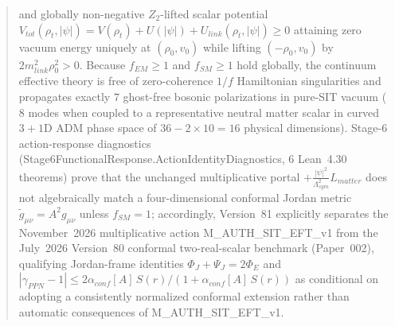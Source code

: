 \documentclass[american,11pt,letterpaper]{article}
\def\mathbb#1{#1}%
\def\mathcal#1{#1}%
\def\mathrm#1{#1}%
\def\texttt#1{#1}%
\begin{document}
\begin{abstract}
and globally non-negative $\mathbb{Z}_2$-lifted scalar potential $V_{\mathrm{tot}}(\rho_t,|\psi|) = V(\rho_t) + U(|\psi|) + U_{\mathrm{link}}(\rho_t,|\psi|) \ge 0$ attaining zero vacuum energy uniquely at $(\rho_0, v_0)$ while lifting $(-\rho_0, v_0)$ by $2 m_{\mathrm{link}}^2 \rho_0^2 > 0$. Because $f_{\mathrm{EM}} \ge 1$ and $f_{\mathrm{SM}} \ge 1$ hold globally, the continuum effective theory is free of zero-coherence $1/f$ Hamiltonian singularities and propagates exactly $7$ ghost-free bosonic polarizations in pure-SIT vacuum ($8$ modes when coupled to a representative neutral matter scalar in curved $3+1$D ADM phase space of $36 - 2\times 10 = 16$ physical dimensions). Stage-6 action-response diagnostics (\texttt{Stage6FunctionalResponse.\allowbreak{}ActionIdentityDiagnostics}, $6$ Lean~4.30 theorems) prove that the unchanged multiplicative portal $+\frac{|\psi|^2}{\Lambda_{\mathrm{sym}}^2}\mathcal{L}_{\mathrm{matter}}$ does not algebraically match a four-dimensional conformal Jordan metric $\tilde{g}_{\mu\nu} = A^2 g_{\mu\nu}$ unless $f_{\mathrm{SM}} = 1$; accordingly, Version~81 explicitly separates the November~2026 multiplicative action \texttt{M\_AUTH\_SIT\_EFT\_v1} from the July~2026 Version~80 conformal two-real-scalar benchmark (Paper~002), qualifying Jordan-frame identities $\Phi_J + \Psi_J = 2\Phi_E$ and $|\gamma_{\mathrm{PPN}} - 1| \le 2\alpha_{\mathrm{conf}}[A]\,S(r)/(1 + \alpha_{\mathrm{conf}}[A]\,S(r))$ as conditional on adopting a consistently normalized conformal extension rather than automatic consequences of \texttt{M\_AUTH\_SIT\_EFT\_v1}.


\end{abstract}
\end{document}
